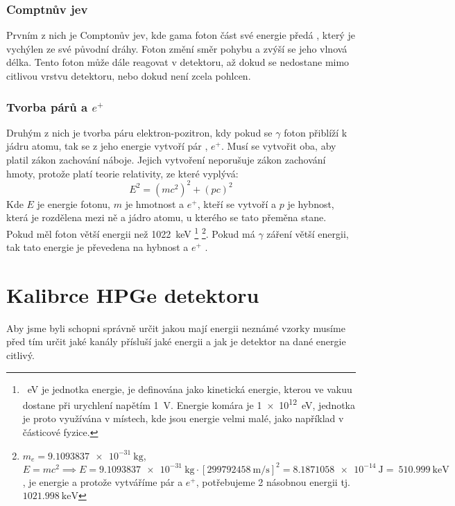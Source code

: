 \subsubsection{Comptnův jev}
Prvním z nich je Comptonův jev, kde gama foton část své energie předá \e , který je vychýlen ze své původní dráhy. Foton změní směr pohybu a zvýší se jeho vlnová délka. \cite{robert_macku}
Tento foton může dále reagovat v detektoru, až dokud se nedostane mimo citlivou vrstvu detektoru, \break nebo dokud není zcela pohlcen.\\
\subsubsection{Tvorba párů \e a $e^+$}
Druhým z nich je tvorba páru elektron-pozitron, kdy pokud se $\gamma$ foton přiblíží k jádru atomu, tak se z jeho energie vytvoří pár \e, $e^+$. Musí se vytvořit oba, aby platil zákon zachování náboje. Jejich vytvoření neporušuje zákon zachování hmoty, protože platí teorie relativity, \break ze které vyplývá:  
\begin{equation}
	E^2 = (mc^2)^2 + (pc)^2
\end{equation}
Kde $E$ je energie fotonu, $m$ je hmotnost \e a $e^+$, kteří se vytvoří a $p$ je hybnost, která je rozdělena mezi ně a jádro atomu, u kterého se tato přeměna stane. 
Pokud měl foton větší energii než \SI{1022}{\kilo\electronvolt} \footnote{\SI{}{\electronvolt} je jednotka energie, je definována jako kinetická energie, kterou ve vakuu \e dostane  při urychlení napětím \SI{1}{\volt}. Energie komára je \SI{1e12}{\electronvolt}, jednotka je proto využívána v místech, kde jsou energie velmi malé, jako například v částicové fyzice.} \footnote{$m_{e} = \SI{9.1093837e-31}{\kilogram}$, $E=mc^2 \implies E = \SI{9.1093837e-31}{\kilogram} \cdot [\SI{299792458}{\meter\per\second}]^2 = \SI{8.1871058e-14}{\joule} =~\SI{510.999}{\kilo\electronvolt}$, je energie \e a protože vytváříme pár \e a $e^+$, potřebujeme 2 násobnou energii tj.~$\SI{1021.998}{\kilo\electronvolt}$}.\enlargethispage{\baselineskip} Pokud má $\gamma$ záření větší energii, tak tato energie je převedena na hybnost \e a $e^+$ \cite{semiconductors,libretext_pair}. %
\section{Kalibrce HPGe detektoru}
Aby jsme byli schopni správně určit jakou mají energii neznámé vzorky musíme před tím určit jaké kanály přísluší jaké energii a jak je detektor na dané energie citlivý.
